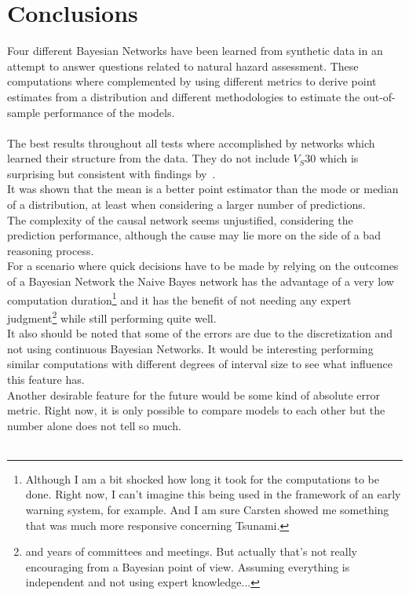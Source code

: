 
\chapter{Conclusions} %

\label{Chapter4} %


Four different Bayesian Networks have been learned from synthetic data in an attempt to answer questions related to natural hazard assessment. These computations where complemented by using different metrics to derive point estimates from a distribution and different methodologies to estimate the out-of-sample performance of the models.\\\\
The best results throughout all tests where accomplished by networks which learned their structure from the data. They do not include $V_S30$ which is surprising but consistent with findings by~\cite{Vogel2014}.\\ 
It was shown that the mean is a better point estimator than the mode or median of a distribution, at least when considering a larger number of predictions.\\
The complexity of the causal network seems unjustified, considering the prediction performance, although the cause may lie more on the side of a bad reasoning process.\\
For a scenario where quick decisions have to be made by relying on the outcomes of a Bayesian Network the Naive Bayes network has the advantage of a very low computation duration\footnote{Although I am a bit shocked how long it took for the computations to be done. Right now, I can't imagine this being used in the framework of an early warning system, for example. And I am sure Carsten showed me something that was much more responsive concerning Tsunami.} and it has the benefit of not needing any expert judgment\footnote{and years of committees and meetings. But actually that's not really encouraging from a Bayesian point of view. Assuming everything is independent and not using expert knowledge...} while still performing quite well.\\
It also should be noted that some of the errors are due to the discretization and not using continuous Bayesian Networks. It would be interesting performing similar computations with different degrees of interval size to see what influence this feature has.\\
Another desirable feature for the future would be some kind of absolute error metric. Right now, it is only possible to compare models to each other but the number alone does not tell so much.\\\\

